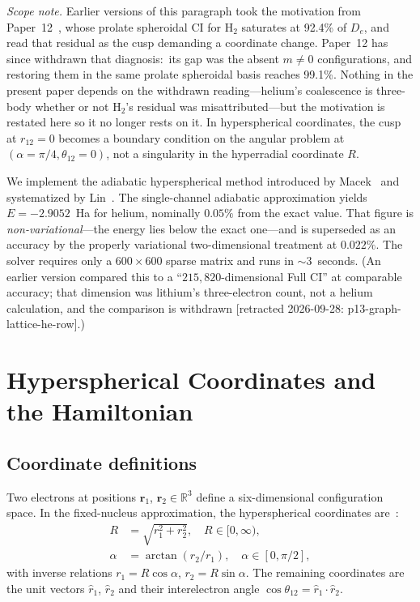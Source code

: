 \documentclass[aps,pra,twocolumn,superscriptaddress,longbibliography]{revtex4-2}
\begin{document}
\emph{Scope note.}  Earlier versions of this paragraph took the
motivation from Paper~12~\cite{loutey_paper12}, whose prolate
spheroidal CI for H$_2$ saturates at 92.4\% of $D_e$, and read that
residual as the cusp demanding a coordinate change.  Paper~12 has
since withdrawn that diagnosis:\ its gap was the absent $m \ne 0$
configurations, and restoring them in the same prolate spheroidal
basis reaches 99.1\%.  Nothing in the present paper depends on the
withdrawn reading---helium's coalescence is three-body whether or
not H$_2$'s residual was misattributed---but the motivation is
restated here so it no longer rests on it.  In hyperspherical
coordinates, the cusp at $r_{12} = 0$ becomes a boundary condition
on the angular problem at $(\alpha = \pi/4, \theta_{12} = 0)$, not a
singularity in the hyperradial coordinate $R$.

We implement the adiabatic hyperspherical method introduced by
Macek~\cite{Macek1968} and systematized by
Lin~\cite{Lin1995}.  The single-channel adiabatic approximation
yields $E = -2.9052$~Ha for helium, nominally $0.05\%$ from the
exact value.  That figure is \emph{non-variational}---the energy lies
below the exact one---and is superseded as an accuracy by the properly
variational two-dimensional treatment at $0.022\%$.  The
solver requires only a $600 \times 600$ sparse matrix and runs in
$\sim$3~seconds.  (An earlier version compared this to a
``$215{,}820$-dimensional Full CI'' at comparable accuracy; that
dimension was lithium's three-electron count, not a helium
calculation, and the comparison is withdrawn
[retracted 2026-09-28: p13-graph-lattice-he-row].)


\section{Hyperspherical Coordinates and the Hamiltonian}
\label{sec:coordinates}

\subsection{Coordinate definitions}

Two electrons at positions $\bm{r}_1$, $\bm{r}_2 \in \mathbb{R}^3$
define a six-dimensional configuration space.  In the fixed-nucleus
approximation, the hyperspherical coordinates
are~\cite{Macek1968, Lin1995}:
\begin{align}
  R &= \sqrt{r_1^2 + r_2^2}, \quad R \in [0, \infty),
    \label{eq:R_def} \\
  \alpha &= \arctan(r_2/r_1), \quad \alpha \in [0, \pi/2],
    \label{eq:alpha_def}
\end{align}
with inverse relations $r_1 = R\cos\alpha$, $r_2 = R\sin\alpha$.
The remaining coordinates are the unit vectors $\hat{r}_1$,
$\hat{r}_2$ and their interelectron angle
$\cos\theta_{12} = \hat{r}_1 \cdot \hat{r}_2$.
\end{document}
